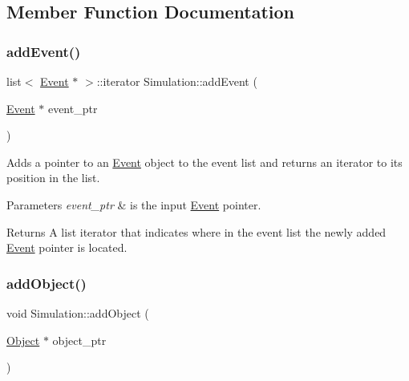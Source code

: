 \subsection{Member Function Documentation}
\mbox{\label{class_simulation_a4b84249d359723e00ec4ae77164c8b7d}} 
\subsubsection{\texorpdfstring{add\+Event()}{addEvent()}}
{\footnotesize\ttfamily list$<$ \hyperlink{class_event}{Event} $\ast$ $>$\+::iterator Simulation\+::add\+Event (\begin{DoxyParamCaption}\item[{\hyperlink{class_event}{Event} $\ast$}]{event\+\_\+ptr }\end{DoxyParamCaption})\hspace{0.3cm}{\ttfamily [protected]}}

Adds a pointer to an \hyperlink{class_event}{Event} object to the event list and returns an iterator to its position in the list. 
\begin{DoxyParams}{Parameters}
{\em event\+\_\+ptr} & is the input \hyperlink{class_event}{Event} pointer. \\
\hline
\end{DoxyParams}
\begin{DoxyReturn}{Returns}
A list iterator that indicates where in the event list the newly added \hyperlink{class_event}{Event} pointer is located. 
\end{DoxyReturn}
\mbox{\label{class_simulation_a1e0f43c4e11eda5486054c250f4de08f}} 
\subsubsection{\texorpdfstring{add\+Object()}{addObject()}}
{\footnotesize\ttfamily void Simulation\+::add\+Object (\begin{DoxyParamCaption}\item[{\hyperlink{class_object}{Object} $\ast$}]{object\+\_\+ptr }\end{DoxyParamCaption})\hspace{0.3cm}{\ttfamily [protected]}}

